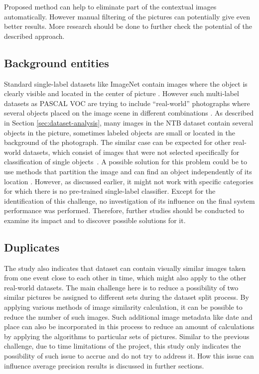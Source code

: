 Proposed method can help to eliminate part of the contextual images automatically. However manual filtering of the pictures can potentially give even better results. More research should be done to further check the potential of the described approach.

\subsection{Background entities}
Standard single-label datasets like ImageNet contain images where the object is clearly visible and located in the center of picture \cite{Russakovsky2015ImageNet}. However such multi-label datasets as PASCAL VOC are trying to include ``real-world'' photographs where several objects placed on the image scene in different combinations \cite{Everingham2010PASCAL-VOC}. As described in Section \ref{sec:dataset-analysis}, many images in the NTB dataset contain several objects in the picture, sometimes labeled objects are small or located in the background of the photograph. The similar case can be expected for other real-world datasets, which consist of images that were not selected specifically for classification of single objects~\cite{Wang2016CNN-RNN:Classification}. A possible solution for this problem could be to use methods that partition the image and can find an object independently of its location \cite{Wei2016HCP, Ren2016, Yang2015}. However, as discussed earlier, it might not work with specific categories for which there is no pre-trained single-label classifier. Except for the identification of this challenge, no investigation of its influence on the final system performance was performed. Therefore, further studies should be conducted to examine its impact and to discover possible solutions for it.

\subsection{Duplicates}
The study also indicates that dataset can contain visually similar images taken from one event close to each other in time, which might also apply to the other real-world datasets. The main challenge here is to reduce a possibility of two similar pictures be assigned to different sets during the dataset split process. By applying various methods of image similarity calculation, it can be possible to reduce the number of such images. Such additional image metadata like date and place can also be incorporated in this process to reduce an amount of calculations by applying the algorithms to particular sets of pictures. Similar to the previous challenge, due to time limitations of the project, this study only indicates the possibility of such issue to accrue and do not try to address it. How this issue can influence average precision results is discussed in further sections.

